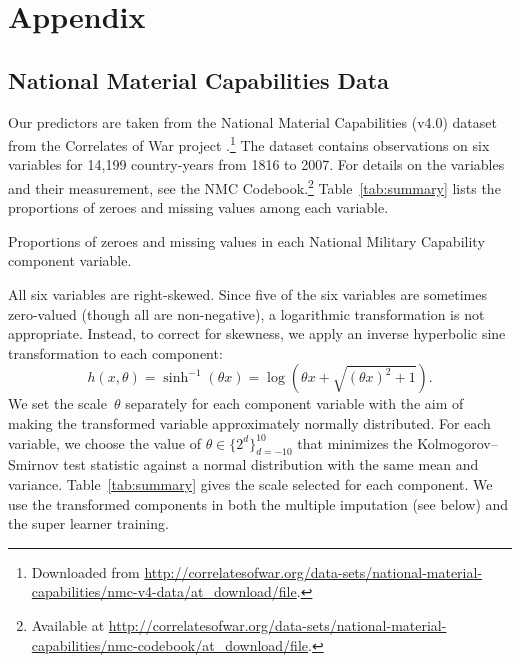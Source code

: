 
\section{Appendix}

\subsection{National Material Capabilities Data}

Our predictors are taken from the National Material Capabilities (v4.0) dataset from the Correlates of War project .\footnote{%
  Downloaded from \url{http://correlatesofwar.org/data-sets/national-material-capabilities/nmc-v4-data/at_download/file}.
}
The dataset contains observations on six variables for 14,199 country-years from 1816 to 2007.
For details on the variables and their measurement, see the NMC Codebook.\footnote{%
  Available at \url{http://correlatesofwar.org/data-sets/national-material-capabilities/nmc-codebook/at_download/file}.
}
Table~\ref{tab:summary} lists the proportions of zeroes and missing values among each variable.

\begin{table}[htp]
  \centering
  
  \caption{
    Proportions of zeroes and missing values in each National Military Capability component variable.
  }
  \label{tab:summary}
\end{table}

All six variables are right-skewed.
Since five of the six variables are sometimes zero-valued (though all are non-negative), a logarithmic transformation is not appropriate.
Instead, to correct for skewness, we apply an inverse hyperbolic sine transformation  to each component:
\begin{equation}
  \label{eq:asinh}
  h(x, \theta)
  =
  \sinh^{-1} (\theta x)
  =
  \log \left(
    \theta x + \sqrt{(\theta x)^2 + 1}
  \right).
\end{equation}
We set the scale~$\theta$ separately for each component variable with the aim of making the transformed variable approximately normally distributed.
For each variable, we choose the value of $\theta \in \{2^d\}_{d=-10}^{10}$ that minimizes the Kolmogorov--Smirnov test statistic  against a normal distribution with the same mean and variance.
Table~\ref{tab:summary} gives the scale selected for each component.
We use the transformed components in both the multiple imputation (see below) and the super learner training.

